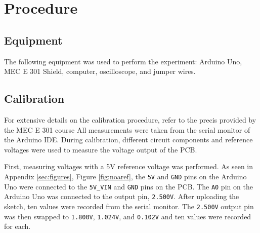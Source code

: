 \section{Procedure}

\subsection{Equipment}
\noindent The following equipment was used to perform the experiment: Arduino Uno, MEC E 301 Shield, computer, oscilloscope, and jumper wires.

\subsection{Calibration}
\noindent For extensive details on the calibration procedure, refer to the precis provided by the MEC E 301 course
All measurements were taken from the serial monitor of the Arduino IDE. During calibration, different circuit components 
and reference voltages were used to measure the voltage output of the PCB.

First, measuring voltages with a 5V reference voltage was performed. As seen in Appendix \ref{sec:figures}, Figure \ref{fig:noaref}, the \texttt{5V} and \texttt{GND} 
pins on the Arduino Uno were connected to the \texttt{5V\_VIN} and \texttt{GND} pins on the PCB. The \texttt{A0} pin on the Arduino Uno was connected to the output pin,
\texttt{2.500V}. After uploading the sketch, ten values were recorded from the serial monitor. The \texttt{2.500V} output pin was then
swapped to \texttt{1.800V}, \texttt{1.024V}, and \texttt{0.102V} and ten values were recorded for each.

